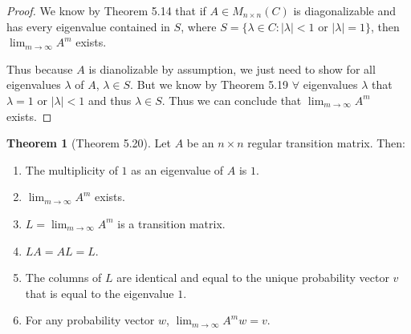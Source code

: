\documentclass{amsart}
\theoremstyle{definition}
\newtheorem{theorem}{Theorem}
\theoremstyle{remark}
\numberwithin{equation}{section}
\begin{document}
\begin{proof}

We know by Theorem 5.14 \cite{friedberg2003linear} that if $A \in M_{n \times n}(C)$ is diagonalizable and has every eigenvalue contained in $S$, where $S = \{ \lambda \in C: |\lambda| < 1$ or $|\lambda| = 1\}$, then $\lim_{m \to \infty} A^m$ exists.


Thus because $A$ is dianolizable by assumption, we just need to show for all eigenvalues $\lambda$ of $A$, $\lambda \in S$.
But we know by Theorem 5.19 $\forall$ eigenvalues $\lambda$ that $\lambda = 1$ or $|\lambda| < 1$ and thus $\lambda \in S$.
Thus we can conclude that $\lim_{m \to \infty} A^m$ exists.

\end{proof}

\begin{theorem}[Theorem 5.20]

Let $A$ be an $n \times n$ regular transition matrix. Then:

\begin{enumerate}

	\item The multiplicity of $1$ as an eigenvalue of $A$ is $1$.

	\item $\lim_{m \to \infty} A^m$ exists.

	\item $L = \lim_{m \to \infty} A^m$ is a transition matrix.

	\item $LA = AL = L$.

	\item The columns of $L$ are identical and equal to the unique probability vector $v$ that is equal to the eigenvalue $1$.

	\item For any probability vector $w$, $\lim_{m \to \infty} A^m w = v$.

\end{enumerate}

\end{theorem}
\end{document}
